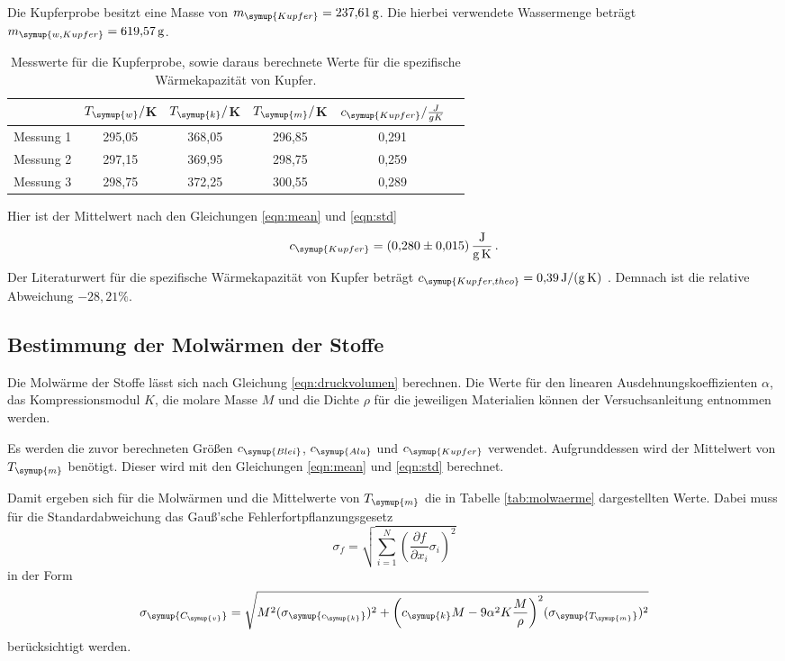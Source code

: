 Die Kupferprobe besitzt eine Masse von $m_{\symup{Kupfer}}=\SI{237.61}{\gram}$.
Die hierbei verwendete Wassermenge beträgt $m_{\symup{w,Kupfer}}=\SI{619.57}{\gram}$.

\begin{table}
  \centering
  \caption{Messwerte für die Kupferprobe, sowie daraus berechnete Werte für die spezifische
  Wärmekapazität von Kupfer.}
  \label{tab:kupfer}
  \begin{tabular}{c c c c c c}
    \toprule
    & $T_{\symup{w}}/$K & $T_{\symup{k}}/$K & $T_{\symup{m}}/$K & $c_{\symup{Kupfer}}/\frac{J}{g K}$ \\
    \midrule
    Messung 1 & 295,05 & 368,05 & 296,85 & 0,291 \\
    Messung 2 & 297,15 & 369,95 & 298,75 & 0,259 \\
    Messung 3 & 298,75 & 372,25 & 300,55 & 0,289 \\
    \bottomrule
  \end{tabular}
\end{table}

Hier ist der Mittelwert nach den Gleichungen \eqref{eqn:mean} und
\eqref{eqn:std}
\begin{equation}
  c_{\symup{Kupfer}} = \SI{0.280(0015)}{\joule\per\gram\per\kelvin} \,.\nonumber
\end{equation}
Der Literaturwert für die spezifische Wärmekapazität von Kupfer beträgt
$c_{\symup{Kupfer,theo}}=\SI{0.39}{\joule\per\gram\per\kelvin}$ \cite{werte}.
Demnach ist die relative Abweichung $-28,21\%$.


\subsection{Bestimmung der Molwärmen der Stoffe}
\label{sec:molwaerme}

Die Molwärme der Stoffe lässt sich nach Gleichung \eqref{eqn:druckvolumen}
berechnen. Die Werte für den linearen Ausdehnungskoeffizienten $\alpha$,
das Kompressionsmodul $K$, die molare Masse $M$ und die Dichte $\rho$
für die jeweiligen Materialien können der Versuchsanleitung \cite{Versuchsanleitung}
entnommen werden.

Es werden die zuvor berechneten Größen $c_{\symup{Blei}}$, $c_{\symup{Alu}}$
und $c_{\symup{Kupfer}}$ verwendet. Aufgrunddessen wird der Mittelwert von
$T_{\symup{m}}$ benötigt. Dieser wird mit den Gleichungen \eqref{eqn:mean} und
\eqref{eqn:std} berechnet.

Damit ergeben sich für die Molwärmen und die Mittelwerte von $T_{\symup{m}}$
die in Tabelle \ref{tab:molwaerme} dargestellten Werte.
Dabei muss für die Standardabweichung das Gauß'sche Fehlerfortpflanzungsgesetz
\begin{equation}
  \sigma_f = \sqrt{
    \sum\limits_{i = 1}^N
      \left( \frac{\partial f}{\partial x_i} \sigma_i \right)^{\!\! 2}
  }
  \label{eqn:gaussfehler}
\end{equation}
in der Form
\begin{equation}
  \sigma_{\symup{C_{\symup{v}}}} = \sqrt{M^2(\sigma_{\symup{c_{\symup{k}}}})^2
  +\biggl(c_{\symup{k}}M-9\alpha^2 K \frac{M}{\rho}\biggr)^2 (\sigma_{\symup{T_{\symup{m}}}})^2}
\end{equation}
berücksichtigt werden.

